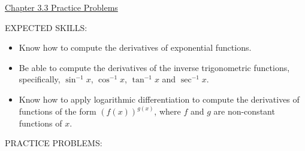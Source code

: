 \documentclass[12pt]{article}
\begin{document}
\begin{center}
\underline{\LARGE{Chapter 3.3 Practice Problems}}
\end{center}

\noindent EXPECTED SKILLS:

\begin{itemize}

\item Know how to compute the derivatives of exponential functions.

\item Be able to compute the derivatives of the inverse trigonometric functions, specifically, $\sin^{-1}{x}$, $\cos^{-1}{x}$, $\tan^{-1}{x}$ and $\sec^{-1}{x}$.

\item Know how to apply logarithmic differentiation to compute the derivatives of functions of the form $\left(f(x)\right)^{g(x)}$, where $f$ and $g$ are non-constant functions of $x$.

\end{itemize}

\noindent PRACTICE PROBLEMS:

\medskip

\end{document}
